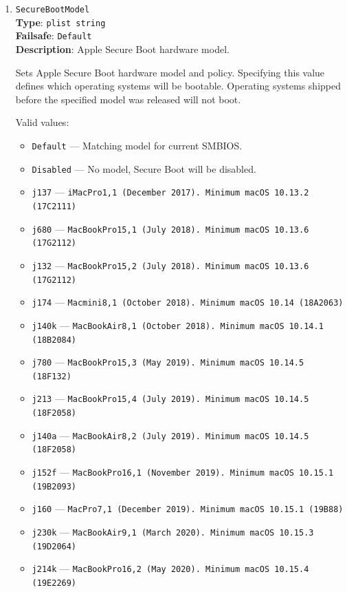 \documentclass[]{article}
\makeatletter
\providecommand{\tightlist}{%
  \setlength{\itemsep}{0pt}\setlength{\parskip}{0pt}}
\renewcommand{\label}[1]{%
\zref@wrapper@immediate{\oldlabel{#1}}}  %
\makeatother
\begin{document}
\begin{enumerate}
\item \label{secureapplesb}
  \texttt{SecureBootModel}\\
  \textbf{Type}: \texttt{plist\ string}\\
  \textbf{Failsafe}: \texttt{Default}\\
  \textbf{Description}: Apple Secure Boot hardware model.

  Sets Apple Secure Boot hardware model and policy. Specifying
  this value defines which operating systems will be bootable.
  Operating systems shipped before the specified model was released
  will not boot.

  Valid values:

  \begin{itemize}
  \tightlist
  \item \texttt{Default} --- Matching model for current SMBIOS.
  \item \texttt{Disabled} --- No model, Secure Boot will be disabled.
  \item \texttt{j137} --- \texttt{iMacPro1,1 (December 2017). Minimum macOS 10.13.2 (17C2111)}
  \item \texttt{j680} --- \texttt{MacBookPro15,1 (July 2018). Minimum macOS 10.13.6 (17G2112)}
  \item \texttt{j132} --- \texttt{MacBookPro15,2 (July 2018). Minimum macOS 10.13.6 (17G2112)}
  \item \texttt{j174} --- \texttt{Macmini8,1 (October 2018). Minimum macOS 10.14 (18A2063)}
  \item \texttt{j140k} --- \texttt{MacBookAir8,1 (October 2018). Minimum macOS 10.14.1 (18B2084)}
  \item \texttt{j780} --- \texttt{MacBookPro15,3 (May 2019). Minimum macOS 10.14.5 (18F132)}
  \item \texttt{j213} --- \texttt{MacBookPro15,4 (July 2019). Minimum macOS 10.14.5 (18F2058)}
  \item \texttt{j140a} --- \texttt{MacBookAir8,2 (July 2019). Minimum macOS 10.14.5 (18F2058)}
  \item \texttt{j152f} --- \texttt{MacBookPro16,1 (November 2019). Minimum macOS 10.15.1 (19B2093)}
  \item \texttt{j160} --- \texttt{MacPro7,1 (December 2019). Minimum macOS 10.15.1 (19B88)}
  \item \texttt{j230k} --- \texttt{MacBookAir9,1 (March 2020). Minimum macOS 10.15.3 (19D2064)}
  \item \texttt{j214k} --- \texttt{MacBookPro16,2 (May 2020). Minimum macOS 10.15.4 (19E2269)}

\end{itemize}
\end{enumerate}
\end{document}
